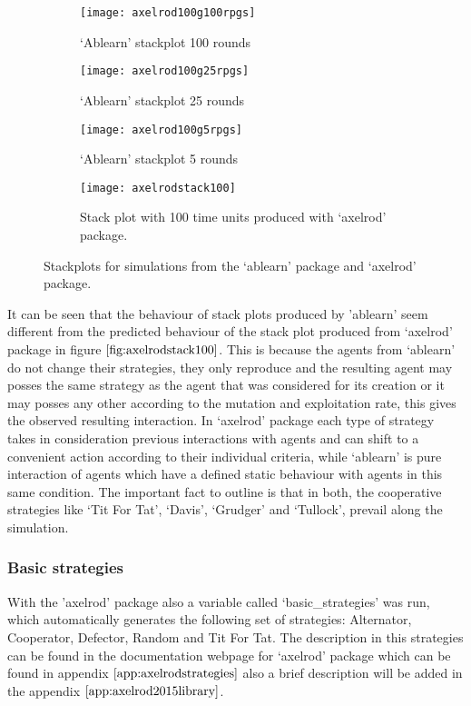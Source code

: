 \begin{figure}[H]       
    \centering
    \begin{subfigure}[b]{0.4\textwidth}
	\centering
	{\texttt{[image: axelrod100g100rpgs]}}   
    	\caption{`Ablearn' stackplot 100 rounds}
	\label{fig:axl100rpgs}
    \end{subfigure}
    \hfill
    \begin{subfigure}[b]{0.4\textwidth}
	\centering
	{\texttt{[image: axelrod100g25rpgs]}}   
    	\caption{`Ablearn' stackplot 25 rounds}
	\label{fig:axl25rpgs}
    \end{subfigure}
    \hfill
    \begin{subfigure}[b]{0.4\textwidth}
	\centering
	{\texttt{[image: axelrod100g5rpgs]}}   
    	\caption{`Ablearn' stackplot 5 rounds}
	\label{fig:axl5rpgs}
    \end{subfigure}
    \hfill
    \begin{subfigure}[b]{0.4\textwidth}
	\centering
	{\texttt{[image: axelrodstack100]}}   
	\caption{Stack plot with 100 time units produced with `axelrod' package.}
	\label{fig:axelrodstack100}
    \end{subfigure}
    \caption{Stackplots for simulations from the `ablearn' package and `axelrod' package.}
    \label{fig:ablearnaxelrodstack}
\end{figure}

It can be seen that the behaviour of stack plots produced by 'ablearn' seem different from the predicted behaviour of the stack plot produced from `axelrod' package in figure $\ref{fig:axelrodstack100}$. This is because the agents from `ablearn' do not change their strategies, they only reproduce and the resulting agent may posses the same strategy as the agent that was considered for its creation or it may posses any other according to the mutation and exploitation rate, this gives the observed resulting interaction. In `axelrod' package each type of strategy takes in consideration previous interactions with agents and can shift to a convenient action according to their individual criteria, while `ablearn' is pure interaction of agents which have a defined static behaviour with agents in this same condition. The important fact to outline is that in both, the cooperative strategies like `Tit For Tat', `Davis', `Grudger' and `Tullock', prevail along the simulation.


\subsubsection{Basic strategies}
With the 'axelrod' package also a variable called `basic\_strategies' was run, which automatically generates the following set of strategies: Alternator, Cooperator, Defector, Random and Tit For Tat. The description in this strategies can be found in the documentation webpage for `axelrod' package which can be found in appendix $\ref{app:axelrodstrategies}$ also a brief description will be added in the appendix $\ref{app:axelrod2015library}$.

